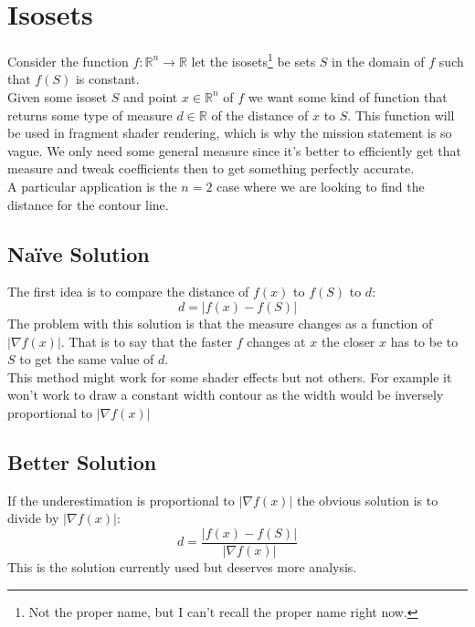 
\section{Isosets}
Consider the function $f: \mathbb{R}^n \rightarrow \mathbb{R}$ let the isosets\footnote{Not the proper name, but I can't recall the proper name right now.} be sets $S$ in the domain of $f$ such that $f(S)$ is constant.
\\

Given some isoset $S$ and point $x \in \mathbb{R}^n$ of $f$ we want some kind of function that returns some type of measure $d \in \mathbb{R}$ of the distance of $x$ to $S$.
This function will be used in fragment shader rendering, which is why the mission statement is so vague.
We only need some general measure since it's better to efficiently get that measure and tweak coefficients then to get something perfectly accurate.
\\

A particular application is the $n=2$ case where we are looking to find the distance for the contour line.

\subsection{Naïve Solution}
The first idea is to compare the distance of $f(x)$ to $f(S)$ to $d$:
\[ d = |f(x)-f(S)|  \]
The problem with this solution is that the measure changes as a function of $|\nabla f(x)|$.
That is to say that the faster $f$ changes at $x$ the closer $x$ has to be to $S$ to get the same value of $d$.
\\

This method might work for some shader effects but not others.
For example it won't work to draw a constant width contour as the width would be inversely proportional to $|\nabla f(x) |$

\subsection{Better Solution}
If the underestimation is proportional to $|\nabla f(x)|$ the obvious solution is to divide by $|\nabla f(x)|$:
\[ d = \frac{|f(x)-f(S)|}{|\nabla f(x)|}\]
This is the solution currently used but deserves more analysis.
\\

